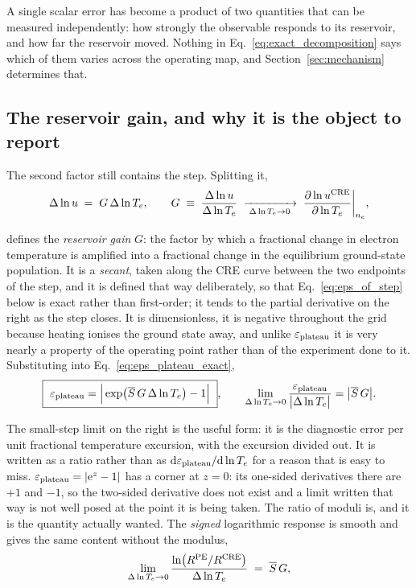 A single scalar error has become a product of two quantities that can be
measured independently: how strongly the observable responds to its reservoir,
and how far the reservoir moved. Nothing in
Eq.~\eqref{eq:exact_decomposition} says which of them varies across the
operating map, and Section~\ref{sec:mechanism} determines that.

\subsection{The reservoir gain, and why it is the object to report}
\label{sec:gain}

The second factor still contains the step. Splitting it,
\begin{equation}
  \Delta\ln u \;=\; G\,\Delta\ln T_e ,
  \qquad
  G \;\equiv\; \frac{\Delta\ln u}{\Delta\ln T_e}
  \;\xrightarrow[\;\Delta\ln T_e\to0\;]{}\;
  \frac{\partial \ln u^{\mathrm{CRE}}}{\partial\ln T_e}\bigg|_{n_e},
  \label{eq:gain_def}
\end{equation}

\noindent defines the \emph{reservoir gain} $G$: the factor by which a
fractional change in electron temperature is amplified into a fractional change
in the equilibrium ground-state population. It is a \emph{secant}, taken along
the CRE curve between the two endpoints of the step, and it is defined that way
deliberately, so that Eq.~\eqref{eq:eps_of_step} below is exact rather than
first-order; it tends to the partial derivative on the right as the step
closes. It is
dimensionless, it is negative throughout the grid because heating ionises the
ground state away, and unlike $\varepsilon_{\mathrm{plateau}}$ it is very nearly a
property of the operating point rather than of the experiment done to it. Substituting into
Eq.~\eqref{eq:eps_plateau_exact},
\begin{equation}
  \boxed{\ \varepsilon_{\mathrm{plateau}} = \Big|\exp\!\big(\overline{S}\,G\,\Delta\ln T_e\big)-1\Big|\ },
  \qquad
  \lim_{\Delta\ln T_e\to0}\frac{\varepsilon_{\mathrm{plateau}}}{\big|\Delta\ln T_e\big|}
  = \big|\overline{S}\,G\big| .
  \label{eq:eps_of_step}
\end{equation}

\noindent The small-step limit on the right is the useful form: it is the
diagnostic error per unit fractional temperature excursion, with the excursion
divided out. It is written as a ratio rather than as
$\mathrm{d}\varepsilon_{\mathrm{plateau}}/\mathrm{d}\ln T_e$ for a reason that is easy to miss.
$\varepsilon_{\mathrm{plateau}} = |\mathrm{e}^{z}-1|$ has a corner at $z=0$: its one-sided
derivatives there are $+1$ and $-1$, so the two-sided derivative does not exist
and a limit written that way is not well posed at the point it is being taken.
The ratio of moduli is, and it is the quantity actually wanted. The
\emph{signed} logarithmic response is smooth and gives the same content without
the modulus,
\begin{equation}
  \lim_{\Delta\ln T_e\to0}
  \frac{\ln\!\big(R^{\mathrm{PE}}/R^{\mathrm{CRE}}\big)}{\Delta\ln T_e}
  \;=\; \overline{S}\,G ,
  \label{eq:signed_response}
\end{equation}

